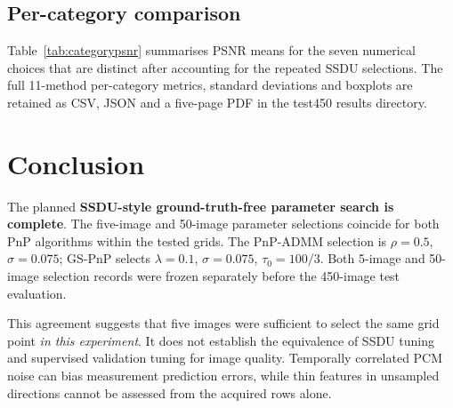 \documentclass[a4paper,10pt]{article}
\begin{document}
\subsection*{Per-category comparison}
Table~\ref{tab:categorypsnr} summarises PSNR means for the seven numerical
choices that are distinct after accounting for the repeated SSDU selections.
The full 11-method per-category metrics, standard deviations and boxplots
are retained as CSV, JSON and a five-page PDF in the test450 results directory.

\begin{table}[htbp]
\centering\tiny
{}
\caption{Per-category mean PSNR (dB), with 90 test images in each category.
ADMM and GS SSDU repeated five/50 selections have been collapsed only in
this compact table, not in the full 11-method results.}
\label{tab:categorypsnr}
\end{table}

\section{Conclusion}

The planned \textbf{SSDU-style ground-truth-free parameter search is complete}. The five-image and 50-image parameter selections coincide for both PnP algorithms within the tested grids. The PnP-ADMM selection is $\rho=0.5$, $\sigma=0.075$; GS-PnP selects $\lambda=0.1$, $\sigma=0.075$, $\tau_0=100/3$. Both 5-image and 50-image selection records were frozen separately before the 450-image test evaluation.

This agreement suggests that five images were sufficient to select the same grid point \emph{in this experiment}. It does not establish the equivalence of SSDU tuning and supervised validation tuning for image quality. Temporally correlated PCM noise can bias measurement prediction errors, while thin features in unsampled directions cannot be assessed from the acquired rows alone.
\end{document}
